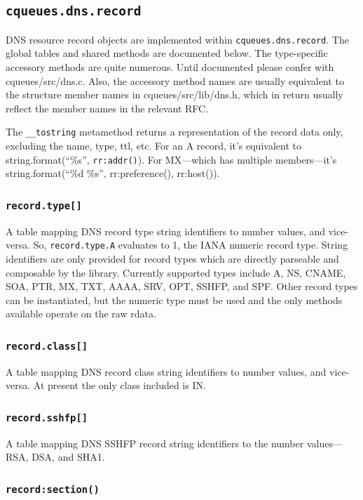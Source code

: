 \documentclass[11pt, oneside]{memoir}
\newcommand*{\fn}[1]{\texttt{#1}\xspace}
\newcommand*{\method}[1]{\texttt{#1}\xspace}
\newcommand*{\module}[1]{\texttt{#1}\xspace}
\newcounter{toccols}
\newenvironment{Module}[1]{
	\subsection{\texttt{#1}}
	\addtocontents{toc}{
		\protect\begin{multicols}{\value{toccols}}
	}
}{
	\addtocontents{toc}{\protect\end{multicols}}
}
\begin{document}
\begin{Module}{cqueues.dns.record}

DNS resource record objects are implemented within \module{cqueues.dns.record}. The global tables and shared methods are documented below. The type-specific accessory methods are quite numerous. Until documented please confer with cqueues/src/dns.c. Also, the accessory method names are usually equivalent to the structure member names in cqueues/src/lib/dns.h, which in return usually reflect the member names in the relevant RFC.

The \fn{\_\_tostring} metamethod returns a representation of the record data only, excluding the name, type, ttl, etc. For an A record, it's equivalent to string.format(``\%s'', \fn{rr:addr()}). For MX---which has multiple members---it's string.format(``\%d \%s'', rr:preference(), rr:host()).

\subsubsection[\fn{record.type[]}]{\fn{record.type[]}}

A table mapping DNS record type string identifiers to number values, and vice-versa. So, \method{record.type.A} evaluates to 1, the IANA numeric record type. String identifiers are only provided for record types which are directly parseable and composable by the library. Currently supported types include A, NS, CNAME, SOA, PTR, MX, TXT, AAAA, SRV, OPT, SSHFP, and SPF. Other record types can be instantiated, but the numeric type must be used and the only methods available operate on the raw rdata.

\subsubsection[\fn{record.class[]}]{\fn{record.class[]}}

A table mapping DNS record class string identifiers to number values, and vice-versa. At present the only class included is IN.

\subsubsection[\fn{record.sshfp[]}]{\fn{record.sshfp[]}}

A table mapping DNS SSHFP record string identifiers to the number values---RSA, DSA, and SHA1.

\subsubsection[\fn{record:section}]{\fn{record:section()}}


\end{Module}
\end{document}
